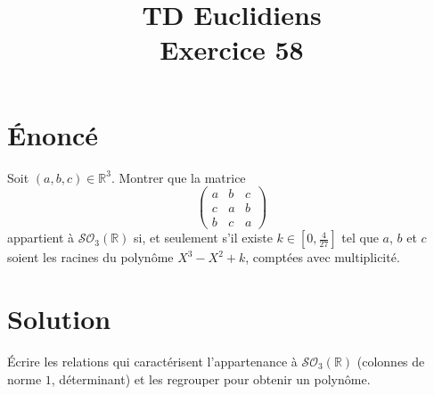 \documentclass[french]{article}
\title{TD Euclidiens\\ Exercice 58}
\date{}
\newcommand{\R}{\mathbb{R}}
\begin{document}
\maketitle

\section{Énoncé}
Soit $(a,b,c)\in\R^3$. Montrer que la matrice $$\begin{pmatrix}
	a&b&c\\
	c&a&b\\
	b&c&a
\end{pmatrix}$$ appartient à $\mathcal{SO}_3(\R)$ si, et seulement s'il existe $k\in\displaystyle\left[0,\frac{4}{27}\right]$ tel que $a$, $b$ et $c$ soient les racines du polynôme $X^3-X^2+k$, comptées avec multiplicité.
\section{Solution}
Écrire les relations qui caractérisent l'appartenance à $\mathcal{SO}_3(\R)$ (colonnes de norme $1$, déterminant) et les regrouper pour obtenir un polynôme.
\end{document}
